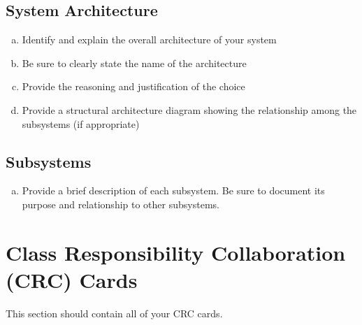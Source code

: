 \documentclass[12pt, titlepage]{article}
\begin{document}
\subsection{System Architecture}
\label{sub:system_architecture}
\begin{enumerate}[a)]
	\item Identify and explain the overall architecture of your system
	\item Be sure to clearly state the name of the architecture
	\item Provide the reasoning and justification of the choice
	\item Provide a structural architecture diagram showing the relationship among the subsystems (if appropriate)
\end{enumerate}

\subsection{Subsystems}
\label{sub:subsystems}
\begin{enumerate}[a)]
	\item Provide a brief description of each subsystem. Be sure to document its purpose and relationship to other subsystems.
\end{enumerate}

	
\section{Class Responsibility Collaboration (CRC) Cards}
\label{sec:class_responsibility_collaboration_crc_cards}
This section should contain all of your CRC cards.
\end{document}
